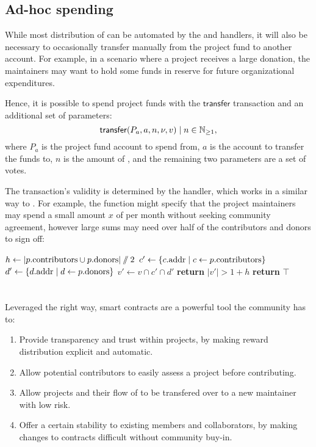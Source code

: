 \subsection{Ad-hoc spending}

While most distribution of \oscoin{} can be automated by the
 and  handlers, it will also be
necessary to occasionally transfer \oscoin{} manually from the project fund to
another account. For example, in a scenario where a project receives a large
donation, the maintainers may want to hold some funds in reserve for future
organizational expenditures.

Hence, it is possible to spend project funds with the $\mathsf{transfer}$
transaction and an additional set of parameters:
\[
    \mathsf{transfer}\lparen P_a, a, n, \nu, v\rparen \mid n \in \mathbb{N}_{\geq 1},
\]
where $P_a$ is the project fund account to spend from, $a$ is the account to
transfer the funds to, $n$ is the amount of \oscoin{}, and the remaining two
parameters are a set of votes.

The transaction's validity is determined by the  handler,
which works in a similar way to . For
example, the function might specify that the project maintainers may spend a small
amount $x$ of \oscoin{} per month without seeking community agreement, however
large sums may need over half of the contributors and donors to sign off:
\medskip
\begin{algorithmic}[0]
            \State $h \gets |p.{\mathrm{contributors}} \cup p.{\mathrm{donors}}| \sslash 2$
            \State $c' \gets \{ c.{\mathrm{addr}} \mid c \gets p.{\mathrm{contributors}} \}$
            \State $d' \gets \{ d.{\mathrm{addr}} \mid d \gets p.{\mathrm{donors}} \}$
            \State $v' \gets v \cap c' \cap d'$
            \State \textbf{return} $|v'| > 1 + h$
            \Else
            \State \textbf{return} $\top$
        \EndIf
    \EndProcedure
\end{algorithmic}

\section*{}

Leveraged the right way, smart contracts are a powerful tool the community has
to:

\begin{enumerate}
    \item Provide transparency and trust within projects, by making reward
        distribution explicit and automatic.
    \item Allow potential contributors to easily assess a project before contributing.
    \item Allow projects and their flow of \oscoin{} to be transfered over to a
        new maintainer with low risk.
    \item Offer a certain stability to existing members and collaborators, by
        making changes to contracts difficult without community buy-in.
\end{enumerate}
